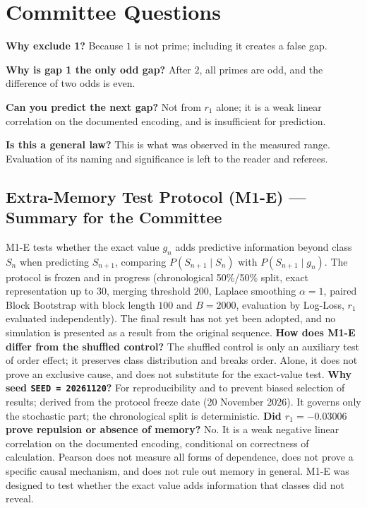 \documentclass[12pt,a4paper]{article}
\begin{document}
\section{Committee Questions}
\textbf{Why exclude 1?} Because $1$ is not prime; including it creates a false gap.

\textbf{Why is gap 1 the only odd gap?} After $2$, all primes are odd, and the difference of two odds is even.

\textbf{Can you predict the next gap?} Not from $r_1$ alone; it is a weak linear correlation on the documented encoding, and is insufficient for prediction.

\textbf{Is this a general law?} This is what was observed in the measured range. Evaluation of its naming and significance is left to the reader and referees.

\subsection*{Extra-Memory Test Protocol (M1-E) --- Summary for the Committee}
M1-E tests whether the exact value $g_n$ adds predictive information beyond class $S_n$ when predicting $S_{n+1}$, comparing $P(S_{n+1}\mid S_n)$ with $P(S_{n+1}\mid g_n)$. The protocol is frozen and in progress (chronological 50\%/50\% split, exact representation up to $30$, merging threshold $200$, Laplace smoothing $\alpha=1$, paired Block Bootstrap with block length $100$ and $B=2000$, evaluation by Log-Loss, $r_1$ evaluated independently). The final result has not yet been adopted, and no simulation is presented as a result from the original sequence.
\textbf{How does M1-E differ from the shuffled control?} The shuffled control is only an auxiliary test of order effect; it preserves class distribution and breaks order. Alone, it does not prove an exclusive cause, and does not substitute for the exact-value test.
\textbf{Why seed \texttt{SEED = 20261120}?} For reproducibility and to prevent biased selection of results; derived from the protocol freeze date (20 November 2026). It governs only the stochastic part; the chronological split is deterministic.
\textbf{Did $r_1=-0.03006$ prove repulsion or absence of memory?} No. It is a weak negative linear correlation on the documented encoding, conditional on correctness of calculation. Pearson does not measure all forms of dependence, does not prove a specific causal mechanism, and does not rule out memory in general. M1-E was designed to test whether the exact value adds information that classes did not reveal.
\end{document}
